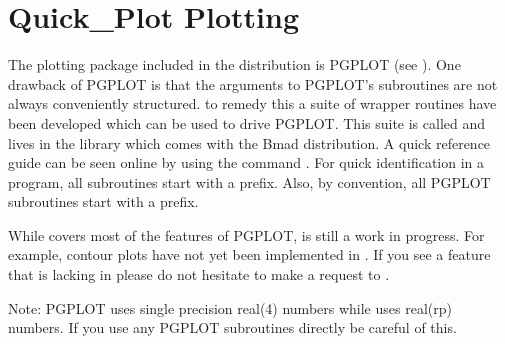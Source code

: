 \chapter{Quick_Plot Plotting}
\label{c:quick.plot}

The plotting package included in the \bmad distribution is PGPLOT
(see ).
One drawback of PGPLOT is that the arguments to
PGPLOT's subroutines are not always conveniently structured. to remedy
this a suite of wrapper routines have been developed which can be
used to drive PGPLOT. This suite is called \quickplot and lives in the
 library which comes with the Bmad distribution. A quick
reference guide can be seen online by using the command . For quick identification in a program, all \quickplot
subroutines start with a  prefix. Also, by convention, all
PGPLOT subroutines start with a  prefix.

While \quickplot covers most of the features of PGPLOT, \quickplot is
still a work in progress.  For example, contour plots have not yet
been implemented in \quickplot. If you see a feature that is lacking
in \quickplot please do not hesitate to make a request to
.

Note: PGPLOT uses single precision real(4) numbers while \quickplot
uses real(rp) numbers.  If you use any PGPLOT subroutines directly be
careful of this.


